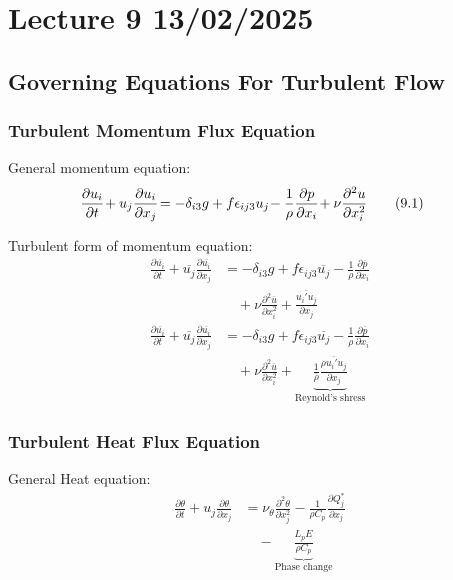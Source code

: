 \documentclass[fleqn,10pt]{SelfArx} %
\begin{document}
\clearpage

\section{Lecture 9 13/02/2025}
\subsection{Governing Equations For Turbulent Flow}
\subsubsection{Turbulent Momentum Flux Equation}
General momentum equation:
\begin{align*}
	\mspace{-20mu}\frac{\partial u_i}{\partial t} \! + u_j\frac{\partial u_i}{\partial x_j} \! = -\delta_{i3}g + f\epsilon_{ij3}u_j \! - \frac{1}{\rho}\frac{\partial p}{\partial x_i} \! + \nu\frac{\partial^2 u}{\partial x_i^2} \tag{9.1} \label{eq:9.1}
\end{align*}

Turbulent form of momentum equation:
\begin{align*}
	\frac{\partial \overline{u_i}}{\partial t} + \overline{u_j}\frac{\partial \overline{u_i}}{\partial x_j} &= -\delta_{i3}g + f\epsilon_{ij3}\overline{u_j} - \frac{1}{\rho}\frac{\partial \overline{p}}{\partial x_i} \\ &\quad + \nu\frac{\partial^2\overline{u}}{\partial x_i^2} + \frac{\overline{u_i'u_j}}{\partial x_j} \\
	\frac{\partial \overline{u_i}}{\partial t} + \overline{u_j}\frac{\partial \overline{u_i}}{\partial x_j} &= -\delta_{i3}g + f\epsilon_{ij3}\overline{u_j} - \frac{1}{\rho}\frac{\partial \overline{p}}{\partial x_i} \\ &\quad + \nu\frac{\partial^2\overline{u}}{\partial x_i^2} + \underbrace{\frac{1}{\overline{\rho}}\frac{\overline{\rho u_i'u_j}}{\partial x_j}}_{\text{Reynold's shress}}
\end{align*}

\subsubsection{Turbulent Heat Flux Equation}
General Heat equation:
\begin{align*}
	\frac{\partial \theta}{\partial t} + u_j\frac{\partial \theta}{\partial x_j} &= \nu_{\theta}\frac{\partial^2 \theta}{\partial x^2_j} - \frac{1}{\rho C_p}\frac{\partial Q_j^*}{\partial x_j} \\ &\quad - \underbrace{\frac{L_p E}{\rho C_p}}_{\text{Phase change}}
\end{align*}
\end{document}
